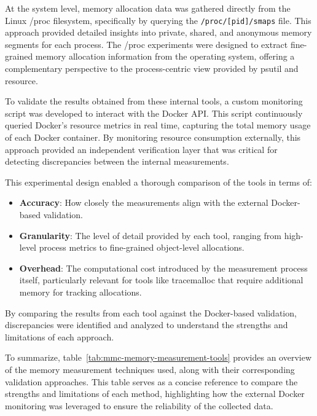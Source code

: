 At the system level, memory allocation data was gathered directly from the Linux /proc filesystem, specifically by querying the \texttt{/proc/[pid]/smaps} file.
This approach provided detailed insights into private, shared, and anonymous memory segments for each process.
The /proc experiments were designed to extract fine-grained memory allocation information from the operating system, offering a complementary perspective to the process-centric view provided by psutil and resource.

To validate the results obtained from these internal tools, a custom monitoring script was developed to interact with the Docker \ac{API}.
This script continuously queried Docker’s resource metrics in real time, capturing the total memory usage of each Docker container.
By monitoring resource consumption externally, this approach provided an independent verification layer that was critical for detecting discrepancies between the internal measurements.

This experimental design enabled a thorough comparison of the tools in terms of:

\begin{itemize}
    \item \textbf{Accuracy}:
    How closely the measurements align with the external Docker-based validation.

    \item \textbf{Granularity}:
    The level of detail provided by each tool, ranging from high-level process metrics to fine-grained object-level allocations.

    \item \textbf{Overhead}:
    The computational cost introduced by the measurement process itself, particularly relevant for tools like tracemalloc that require additional memory for tracking allocations.
\end{itemize}

By comparing the results from each tool against the Docker-based validation, discrepancies were identified and analyzed to understand the strengths and limitations of each approach.

To summarize, table~\ref{tab:mmc-memory-measurement-tools} provides an overview of the memory measurement techniques used, along with their corresponding validation approaches.
This table serves as a concise reference to compare the strengths and limitations of each method, highlighting how the external Docker monitoring was leveraged to ensure the reliability of the collected data.

